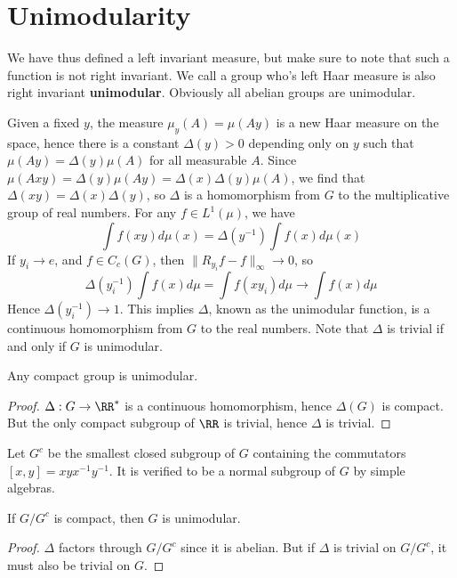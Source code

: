 \section{Unimodularity}

We have thus defined a left invariant measure, but make sure to note that such a function is not right invariant. We call a group who's left Haar measure is also right invariant {\bf unimodular}. Obviously all abelian groups are unimodular.

Given a fixed $y$, the measure $\mu_y(A) = \mu(Ay)$ is a new Haar measure on the space, hence there is a constant $\Delta(y) > 0$ depending only on $y$ such that $\mu(Ay) = \Delta(y) \mu(A)$ for all measurable $A$. Since $\mu(Axy) = \Delta(y) \mu(Ay) = \Delta(x) \Delta(y) \mu(A)$, we find that $\Delta(xy) = \Delta(x) \Delta(y)$, so $\Delta$ is a homomorphism from $G$ to the multiplicative group of real numbers. For any $f \in L^1(\mu)$, we have
%
\[ \int f(xy) d\mu(x) = \Delta(y^{-1}) \int f(x) d\mu(x)  \]
%
If $y_i \to e$, and $f \in C_c(G)$, then $\| R_{y_i} f - f \|_\infty \to 0$, so
%
\[ \Delta(y_i^{-1}) \int f(x) d\mu = \int f(xy_i) d\mu \to \int f(x) d\mu \]
%
Hence $\Delta(y_i^{-1}) \to 1$. This implies $\Delta$, known as the unimodular function, is a continuous homomorphism from $G$ to the real numbers. Note that $\Delta$ is trivial if and only if $G$ is unimodular.

\begin{theorem}
    Any compact group is unimodular.
\end{theorem}
\begin{proof}
    $\Delta: G \to \RR^*$ is a continuous homomorphism, hence $\Delta(G)$ is compact. But the only compact subgroup of $\RR$ is trivial, hence $\Delta$ is trivial.
\end{proof}

Let $G^c$ be the smallest closed subgroup of $G$ containing the commutators $[x,y] = xyx^{-1}y^{-1}$. It is verified to be a normal subgroup of $G$ by simple algebras.

\begin{theorem}
    If $G/G^c$ is compact, then $G$ is unimodular.
\end{theorem}
\begin{proof}
    $\Delta$ factors through $G/G^c$ since it is abelian. But if $\Delta$ is trivial on $G/G^c$, it must also be trivial on $G$.
\end{proof}

